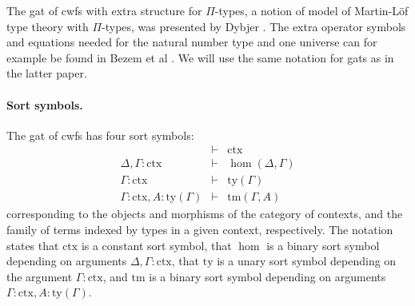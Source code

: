\documentclass[11pt,a4paper]{article}
\theoremstyle{definition}
\newcommand{\ctx}{\mathrm{ctx}}
\newcommand{\ty}{\mathrm{ty}}
\newcommand{\tm}{\mathrm{tm}}
\begin{document}
The gat of cwfs with extra structure for $\Pi$-types, a notion of model of Martin-Löf type theory with $\Pi$-types, was presented by Dybjer \cite{dybjer:torino}. The extra operator symbols and equations needed for the natural number type and one universe can for example be found in Bezem et al \cite{bezem:hofmann}. We will use the same notation for gats as in the latter paper. 

\paragraph{Sort symbols.}
The gat of cwfs has four sort symbols:
\begin{eqnarray*}
&\vdash& \ctx\\
\Delta, \Gamma : \ctx&\vdash& \hom(\Delta,\Gamma)\\
\Gamma : \ctx&\vdash& \ty(\Gamma)\\
\Gamma : \ctx, A : \ty(\Gamma)&\vdash& \tm(\Gamma,A)
\end{eqnarray*}
corresponding to the objects and morphisms of the category of contexts, and the family of terms indexed by types in a given context, respectively. The notation states that $\ctx$ is a constant sort symbol, that $\hom$ is a binary sort symbol depending on arguments $\Delta, \Gamma : \ctx$, that $\ty$ is a unary sort symbol depending on the argument $\Gamma : \ctx$, and $\tm$ is a binary sort symbol depending on arguments $\Gamma : \ctx, A : \ty(\Gamma)$.
\end{document}
